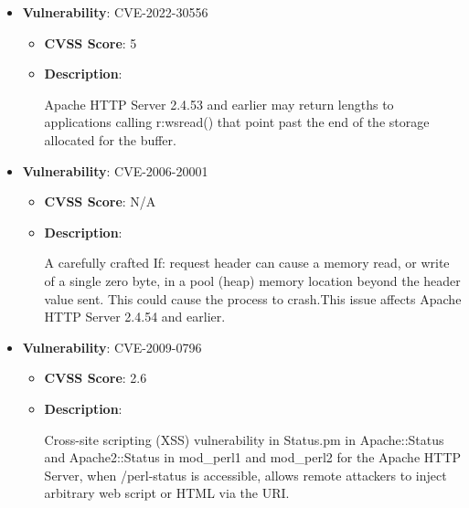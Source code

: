 \documentclass{article}
\begin{document}
\begin{itemize}
        \item \textbf{Vulnerability}: CVE-2022-30556
        \begin{itemize}
            \item \textbf{CVSS Score}:  5 
            \item \textbf{Description}:
            \parbox[t]{0.9\linewidth}{
                \ttfamily Apache HTTP Server 2.4.53 and earlier may return lengths to applications calling r:wsread() that point past the end of the storage allocated for the buffer.
            }
        \end{itemize}
    
        \item \textbf{Vulnerability}: CVE-2006-20001
        \begin{itemize}
            \item \textbf{CVSS Score}:  N/A 
            \item \textbf{Description}:
            \parbox[t]{0.9\linewidth}{
                \ttfamily A carefully crafted If: request header can cause a memory read, or write of a single zero byte, in a pool (heap) memory location beyond the header value sent. This could cause the process to crash.This issue affects Apache HTTP Server 2.4.54 and earlier.
            }
        \end{itemize}
    
        \item \textbf{Vulnerability}: CVE-2009-0796
        \begin{itemize}
            \item \textbf{CVSS Score}:  2.6 
            \item \textbf{Description}:
            \parbox[t]{0.9\linewidth}{
                \ttfamily Cross-site scripting (XSS) vulnerability in Status.pm in Apache::Status and Apache2::Status in mod\_perl1 and mod\_perl2 for the Apache HTTP Server, when /perl-status is accessible, allows remote attackers to inject arbitrary web script or HTML via the URI.
            }
        \end{itemize}
    

\end{itemize}
\end{document}
